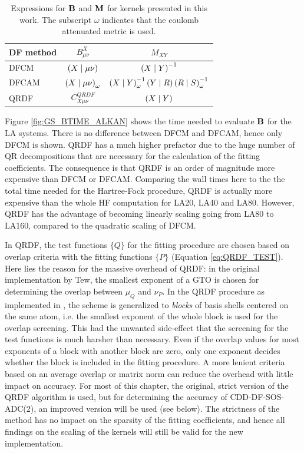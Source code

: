 \begin{table}
\centering
\begin{tabular}{lcc}
\hline
DF method & $B^X_{\mu\nu}$ & $M_{XY}$ \\
\hline
DFCM & $\left( X \mid \mu\nu \right)$ &  $\left( X \mid Y \right)^{-1}$ \\
DFCAM & $\left( X \mid \mu\nu \right)_{\omega}$ & $\left( X \mid Y \right)_{\omega}^{-1} \left( Y \mid R \right) \left( R \mid S \right)_{\omega}^{-1}$ \\
QRDF & $C^{QRDF}_{X\mu\nu}$ & $\left( X \mid Y \right)$ \\ 
\hline
\end{tabular}
\caption{Expressions for $\mathbf{B}$ and $\mathbf{M}$ for kernels presented in this work. The subscript $\omega$ indicates that the coulomb attenuated metric is used. \label{tab:BMTENSORS}}
\end{table}

Figure \ref{fig:GS_BTIME_ALKAN} shows the time needed to evaluate $\mathbf{B}$ for the LA systems. There is no difference between DFCM and DFCAM, hence only DFCM is shown. QRDF has a much higher prefactor due to the huge number of QR decompositions that are necessary for the calculation of the fitting coefficients. The consequence is that QRDF is an order of magnitude more expensive than DFCM or DFCAM. Comparing the wall times here to the the total time needed for the Hartree-Fock procedure, QRDF is actually more expensive than the whole HF computation for LA20, LA40 and LA80. However, QRDF has the advantage of becoming linearly scaling going from LA80 to LA160, compared to the quadratic scaling of DFCM.  

In QRDF, the test functions $\{Q\}$ for the fitting procedure are chosen based on overlap criteria with the fitting functions $\{P\}$ (Equation \ref{eq:QRDF_TEST}). Here lies the reason for the massive overhead of QRDF: in the original implementation by Tew, the smallest exponent of a GTO is chosen for determining the overlap between $\mu_Q$ and $\nu_P$. In the QRDF procedure as implemented in \mchem{}, the scheme is generalized to \emph{blocks} of basis shells centered on the same atom, i.e. the smallest exponent of the whole block is used for the overlap screening. This had the unwanted side-effect that the screening for the test functions is much harsher than necessary. Even if the overlap values for most exponents of a block with another block are zero, only one exponent decides whether the block is included in the fitting procedure. A more lenient criteria based on an average overlap or matrix norm can reduce the overhead with little impact on accuracy. For most of this chapter, the original, strict version of the QRDF algorithm is used, but for determining the accuracy of CDD-DF-SOS-ADC(2), an improved version will be used (see below). The strictness of the method has no impact on the sparsity of the fitting coefficients, and hence all findings on the scaling of the kernels will still be valid for the new implementation.

